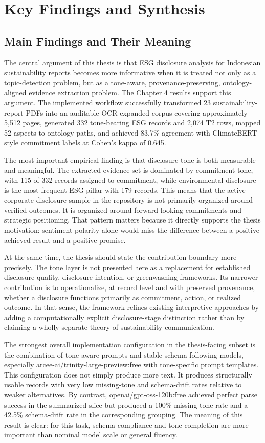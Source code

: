 \documentclass[english, online, cse, master]{dithesis}
\begin{document}
\section{Key Findings and Synthesis}

\subsection{Main Findings and Their Meaning}

The central argument of this thesis is that ESG disclosure analysis for Indonesian sustainability reports becomes more informative when it is treated not only as a topic-detection problem, but as a tone-aware, provenance-preserving, ontology-aligned evidence extraction problem. The Chapter 4 results support this argument. The implemented workflow successfully transformed 23 sustainability-report PDFs into an auditable OCR-expanded corpus covering approximately 5,512 pages, generated 332 tone-bearing ESG records and 2,074 T2 rows, mapped 52 aspects to ontology paths, and achieved 83.7\% agreement with ClimateBERT-style commitment labels at Cohen’s kappa of 0.645.

The most important empirical finding is that disclosure tone is both measurable and meaningful. The extracted evidence set is dominated by commitment tone, with 115 of 332 records assigned to commitment, while environmental disclosure is the most frequent ESG pillar with 179 records. This means that the active corporate disclosure sample in the repository is not primarily organized around verified outcomes. It is organized around forward-looking commitments and strategic positioning. That pattern matters because it directly supports the thesis motivation: sentiment polarity alone would miss the difference between a positive achieved result and a positive promise.

At the same time, the thesis should state the contribution boundary more precisely. The tone layer is not presented here as a replacement for established disclosure-quality, disclosure-intention, or greenwashing frameworks. Its narrower contribution is to operationalize, at record level and with preserved provenance, whether a disclosure functions primarily as commitment, action, or realized outcome. In that sense, the framework refines existing interpretive approaches by adding a computationally explicit disclosure-stage distinction rather than by claiming a wholly separate theory of sustainability communication.

The strongest overall implementation configuration in the thesis-facing subset is the combination of tone-aware prompts and stable schema-following models, especially arcee-ai/trinity-large-preview:free with tone-specific prompt templates. This configuration does not simply produce more text. It produces structurally usable records with very low missing-tone and schema-drift rates relative to weaker alternatives. By contrast, openai/gpt-oss-120b:free achieved perfect parse success in the summarized slice but produced a 100\% missing-tone rate and a 42.5\% schema-drift rate in the corresponding grouping. The meaning of this result is clear: for this task, schema compliance and tone completion are more important than nominal model scale or general fluency.
\end{document}
